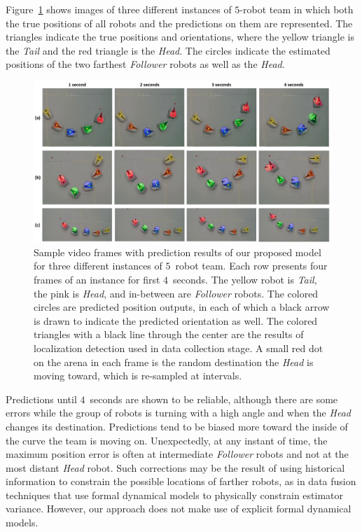 \documentclass[letterpaper, 10 pt, conference]{ieeeconf}  %
\begin{document}
    Figure~\ref{fig:preds} shows images of three different instances of
    $5$-robot team in which both the true positions of all robots and
    the predictions on them are represented. The triangles indicate the
    true positions and orientations, where the yellow triangle is the
    \emph{Tail} and the red triangle is the \emph{Head}. The circles
    indicate the estimated positions of the two farthest \emph{Follower}
    robots as well as the \emph{Head}.
	\begin{figure}[t]
		\centering
		\includegraphics[width=2.\columnwidth]{fig_preds}
		\caption{Sample video frames with prediction results of our proposed model
			for three different instances of $5$~robot team.
			Each row presents four frames of an instance for first $4$~seconds.
			The yellow robot is \emph{Tail}, the pink is \emph{Head}, and
			in-between are \emph{Follower} robots.
			The colored circles are predicted position outputs, in each
			of which a black arrow is drawn to indicate the predicted orientation as well.
			The colored triangles with a black line through the center are the
			results of localization detection used in data collection stage.
			A small red dot on the arena in each frame is the random destination the
			\emph{Head} is moving toward, which is re-sampled at intervals.
		}
		\label{fig:preds}
	\end{figure}
    Predictions until $4$~seconds are shown to be
    reliable, although there are some errors while the group of robots
    is turning with a high angle and when the \emph{Head} changes its
    destination. Predictions tend to be biased more toward the inside of
    the curve the team is moving on. Unexpectedly, at any instant of
    time, the maximum position error is often at intermediate
    \emph{Follower} robots and not at the most distant \emph{Head}
    robot. Such corrections may be the result of using historical
    information to constrain the possible locations of farther robots,
    as in data fusion techniques that use formal dynamical models to
    physically constrain estimator variance. However, our approach does
    not make use of explicit formal dynamical models.
\end{document}
